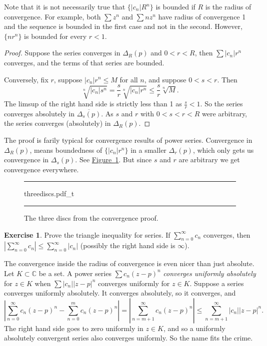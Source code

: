 \documentclass[12pt,openany]{book}
\newcommand{\sabs}[1]{\lvert {#1} \rvert}
\newcommand{\abs}[1]{\left\lvert {#1} \right\rvert}
\newcommand{\C}{{\mathbb{C}}}
\newcommand{\myindex}[1]{#1\index{#1}}
\theoremstyle{plain}
\theoremstyle{remark}
\theoremstyle{definition}
\newenvironment{exbox}{%
    \def\FrameCommand{\vrule width 1pt \relax\hspace{10pt}}%
    \MakeFramed{\advance\hsize-\width\FrameRestore}%
}{%
    \endMakeFramed
}
\newenvironment{myfig}{%
\begin{figure}[h!t]
\noindent\rule{\textwidth}{0.4pt}\vspace{12pt}\par\centering}%
{\par\noindent\rule{\textwidth}{0.4pt}
\end{figure}}
\theoremstyle{exercise}
\newtheorem{exercise}{Exercise}[section]
\theoremstyle{example}
\newcommand{\figureref}[1]{\hyperref[#1]{Figure~\ref*{#1}}}
\begin{document}
Note that it is not necessarily true that $\bigl\{ \sabs{c_n} R^n \bigr\}$
is bounded if $R$ is the radius of convergence.
For example, both $\sum z^n$ and $\sum n z^n$ have
radius of convergence 1 and the sequence is bounded in the first case and
not in the second.  However, $\{ n r^n \}$ is bounded for every $r < 1$.

\begin{proof}
Suppose the series converges in $\Delta_{R}(p)$ and
$0 < r < R$, then $\sum \sabs{c_n}r^n$ converges,
and the terms of that series are bounded.

Conversely, fix $r$, suppose 
$\sabs{c_n} r^n \leq M$ for all $n$, and suppose $0 < s < r$.
Then
\begin{equation*}
\sqrt[n]{\sabs{c_n} s^n}=
\frac{s}{r}\sqrt[n]{\sabs{c_n} r^n} \leq \frac{s}{r} \sqrt[n]{M} .
\end{equation*}
The limsup of the right hand side is strictly less than 1 as $\frac{s}{r} < 1$.
So the series converges absolutely in
$\overline{\Delta_s(p)}$.  As $s$ and $r$ with $0 < s < r < R$ were
arbitrary,
the series converges (absolutely) in $\Delta_R(p)$.
\end{proof}

The proof is farily typical for convergence results of power series.
Convergence in $\Delta_R(p)$, means boundedness of
$\{ \sabs{c_n} r^n \}$ in a smaller $\Delta_r(p)$, which only gets us convergence
in $\Delta_s(p)$.  See \figureref{fig:threediscs}.  But since $s$ and $r$
are arbitrary we get convergence everywhere.
\begin{myfig}
{threediscs.pdf_t}
\caption{The three discs from the convergence proof.\label{fig:threediscs}}
\end{myfig}

\begin{exbox}
\begin{exercise}
Prove the triangle inequality for series.  If $\sum_{n=0}^\infty c_n$
converges, then $\abs{\sum_{n=0}^\infty c_n} \leq \sum_{n=0}^\infty
\sabs{c_n}$ (possibly the right hand side is $\infty$).
\end{exercise}
\end{exbox}

The convergence inside the radius of convergence is even nicer than just absolute.
Let $K \subset \C$ be a set.
A power series $\sum c_n {(z-p)}^n$
\emph{\myindex{converges uniformly absolutely}}
for $z \in K$ when $\sum \sabs{c_n} \sabs{z-p}^n$
converges uniformly for $z \in K$.
Suppose a series converges uniformly absolutely.  It converges absolutely,
so it converges, and 
\begin{equation*}
\abs{
\sum_{n=0}^\infty c_n {(z-p)}^n
-
\sum_{n=0}^{m} c_n {(z-p)}^n
}
=
\abs{\sum_{n=m+1}^\infty c_n {(z-p)}^n} \leq
\sum_{n=m+1}^\infty \sabs{c_n} \sabs{z-p}^n .
\end{equation*}
The right hand side goes to zero uniformly in $z \in K$,
and so
a uniformly absolutely convergent series also converges
uniformly.  So the name fits the crime.
\end{document}
